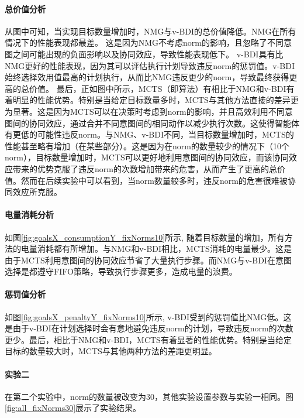 \paragraph{总价值分析}
从图中可知，当实现目标数量增加时，NMG与v-BDI的总价值降低。NMG在所有情况下的性能表现都最差。
这是因为NMG不考虑norm的影响，且忽略了不同意图之间可能出现的负面影响以及协同效应，导致性能表现低下。
v-BDI具有比NMG更好的性能表现，因为其可以评估执行计划导致违反norm的惩罚值。v-BDI始终选择效用值最高的计划执行，从而比NMG违反更少的norm，导致最终获得更高的总价值。
最后，正如图中所示，MCTS（即\SAN 算法）有相比于NMG和v-BDI有着明显的性能优势。特别是当给定目标数量多时，MCTS与其他方法直接的差异更为显著。这是因为MCTS可以在决策时考虑到norm的影响，并且高效利用不同意图间的协同效应，通过合并不同意图间的相同动作以减少执行次数。这使得智能体有更低的可能性违反norm。与NMG、v-BDI不同，当目标数量增加时，MCTS的性能甚至略有增加（在某些部分）。这是因为在norm的数量较少的情况下（10个norm），目标数量增加时，MCTS可以更好地利用意图间的协同效应，而该协同效应带来的优势克服了违反norm的次数增加带来的危害，从而产生了更高的总价值。然而在后续实验中可以看到，当norm数量较多时，违反norm的危害很难被协同效应所克服。

\paragraph{电量消耗分析}
如图\ref{fig:goalsX_consumptionY_fixNorms10}所示, 随着目标数量的增加，所有方法的电量消耗都有所增加。与NMG和v-BDI相比，MCTS消耗的电量最少。这是由于MCTS利用意图间的协同效应节省了大量执行步骤。而NMG与v-BDI在意图选择是都遵守FIFO策略，导致执行步骤更多，造成电量的浪费。
\paragraph{惩罚值分析}
如图\ref{fig:goalsX_penaltyY_fixNorms10}所示, v-BDI受到的惩罚值比NMG低。这是由于v-BDI在计划选择时会有意地避免违反norm的计划，导致违反norm的次数更少。最后，相比于NMG和v-BDI，MCTS有着显著的性能优势。特别是当给定目标的数量较大时，MCTS与其他两种方法的差距更明显。

\paragraph{实验二}
在第二个实验中，norm的数量被改变为30，其他实验设置参数与实验一相同。图\ref{fig:all_fixNorms30}展示了实验结果。

